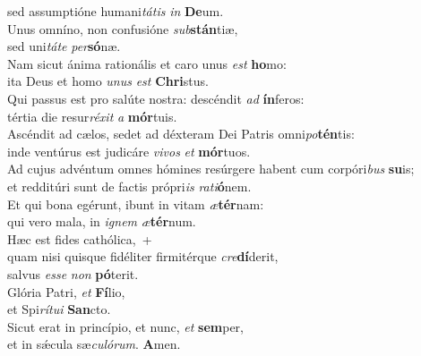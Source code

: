 \oddverse sed assumptióne humani\textit{tá}\textit{tis} \textit{in} \textbf{De}um.\\
\evenverse Unus omníno, non confusióne \textit{sub}\textbf{stán}tiæ,~\*\\
\evenverse sed uni\textit{tá}\textit{te} \textit{per}\textbf{só}næ.\\
\oddverse Nam sicut ánima rationális et caro unus \textit{est} \textbf{ho}mo:~\*\\
\oddverse ita Deus et homo \textit{u}\textit{nus} \textit{est} \textbf{Chri}stus.\\
\evenverse Qui passus est pro salúte nostra: descéndit \textit{ad} \textbf{ín}feros:~\*\\
\evenverse tértia die resur\textit{ré}\textit{xit} \textit{a} \textbf{mór}tuis.\\
\oddverse Ascéndit ad cælos, sedet ad déxteram Dei Patris omni\textit{po}\textbf{tén}tis:~\*\\
\oddverse inde ventúrus est judicáre \textit{vi}\textit{vos} \textit{et} \textbf{mór}tuos.\\
\evenverse Ad cujus advéntum omnes hómines resúrgere habent cum corpóri\textit{bus} \textbf{su}is;~\*\\
\evenverse et redditúri sunt de factis própri\textit{is} \textit{ra}\textit{ti}\textbf{ó}nem.\\
\oddverse Et qui bona egérunt, ibunt in vitam \textit{æ}\textbf{tér}nam:~\*\\
\oddverse qui vero mala, in \textit{i}\textit{gnem} \textit{æ}\textbf{tér}num.\\
\evenverse Hæc est fides cathólica,~+\\
\evenverse  quam nisi quisque fidéliter firmitérque \textit{cre}\textbf{dí}derit,~\*\\
\evenverse salvus \textit{es}\textit{se} \textit{non} \textbf{pó}terit.\\
\oddverse Glória Patri, \textit{et} \textbf{Fí}lio,~\*\\
\oddverse et Spi\textit{rí}\textit{tu}\textit{i} \textbf{San}cto.\\
\evenverse Sicut erat in princípio, et nunc, \textit{et} \textbf{sem}per,~\*\\
\evenverse et in sǽcula sæ\textit{cu}\textit{ló}\textit{rum}. \textbf{A}men.\\
